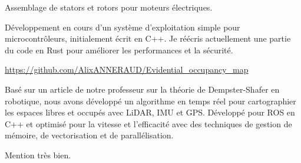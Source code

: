 \documentclass[10pt,a4paper,ragged2e,withhyper]{../AltaCV/altacv}
\begin{document}
\begin{paracol}{2}
  Assemblage de stators et rotors pour moteurs électriques.

  \smallskip


  Développement en cours d'un système d'exploitation simple pour microcontrôleurs, initialement écrit en C++.
  Je réécris actuellement une partie du code en Rust pour améliorer les performances et la sécurité.

  \divider

  {\url{https://github.com/AlixANNERAUD/Evidential_occupancy_map}}
  {}
  {}

  Basé sur un article de notre professeur sur la théorie de Dempster-Shafer en robotique, nous avons développé un algorithme en temps réel pour cartographier les espaces libres et occupés avec LiDAR, IMU et GPS.
  Développé pour ROS en C++ et optimisé pour la vitesse et l'efficacité avec des techniques de gestion de mémoire, de vectorisation et de parallélisation.
  
  \medskip

  \switchcolumn



  \divider

  Mention très bien.

  \divider


  \smallskip



  \divider


  \divider




\end{paracol}
\end{document}

